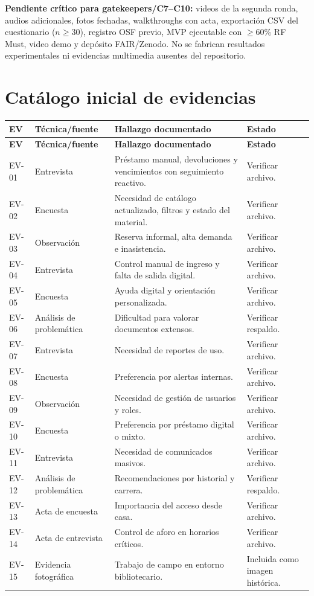 \documentclass[12pt,journal,onecolumn]{IEEEtran}
\begin{document}
\textbf{Pendiente crítico para gatekeepers/C7--C10:} videos de la segunda ronda, audios adicionales, fotos fechadas, walkthroughs con acta, exportación CSV del cuestionario ($n\geq30$), registro OSF previo, MVP ejecutable con $\geq$60\% RF Must, video demo y depósito FAIR/Zenodo. No se fabrican resultados experimentales ni evidencias multimedia ausentes del repositorio.

\appendices
\section{Catálogo inicial de evidencias}
\begin{longtable}{P{0.12\textwidth}P{0.23\textwidth}P{0.45\textwidth}P{0.13\textwidth}}\toprule
\textbf{EV} & \textbf{Técnica/fuente} & \textbf{Hallazgo documentado} & \textbf{Estado}\\\midrule\endfirsthead
\toprule\textbf{EV} & \textbf{Técnica/fuente} & \textbf{Hallazgo documentado} & \textbf{Estado}\\\midrule\endhead
EV-01 & Entrevista & Préstamo manual, devoluciones y vencimientos con seguimiento reactivo. & Verificar archivo.\\
EV-02 & Encuesta & Necesidad de catálogo actualizado, filtros y estado del material. & Verificar archivo.\\
EV-03 & Observación & Reserva informal, alta demanda e inasistencia. & Verificar archivo.\\
EV-04 & Entrevista & Control manual de ingreso y falta de salida digital. & Verificar archivo.\\
EV-05 & Encuesta & Ayuda digital y orientación personalizada. & Verificar archivo.\\
EV-06 & Análisis de problemática & Dificultad para valorar documentos extensos. & Verificar respaldo.\\
EV-07 & Entrevista & Necesidad de reportes de uso. & Verificar archivo.\\
EV-08 & Encuesta & Preferencia por alertas internas. & Verificar archivo.\\
EV-09 & Observación & Necesidad de gestión de usuarios y roles. & Verificar archivo.\\
EV-10 & Encuesta & Preferencia por préstamo digital o mixto. & Verificar archivo.\\
EV-11 & Entrevista & Necesidad de comunicados masivos. & Verificar archivo.\\
EV-12 & Análisis de problemática & Recomendaciones por historial y carrera. & Verificar respaldo.\\
EV-13 & Acta de encuesta & Importancia del acceso desde casa. & Verificar archivo.\\
EV-14 & Acta de entrevista & Control de aforo en horarios críticos. & Verificar archivo.\\
EV-15 & Evidencia fotográfica & Trabajo de campo en entorno bibliotecario. & Incluida como imagen histórica.\\\bottomrule
\end{longtable}
\end{document}
